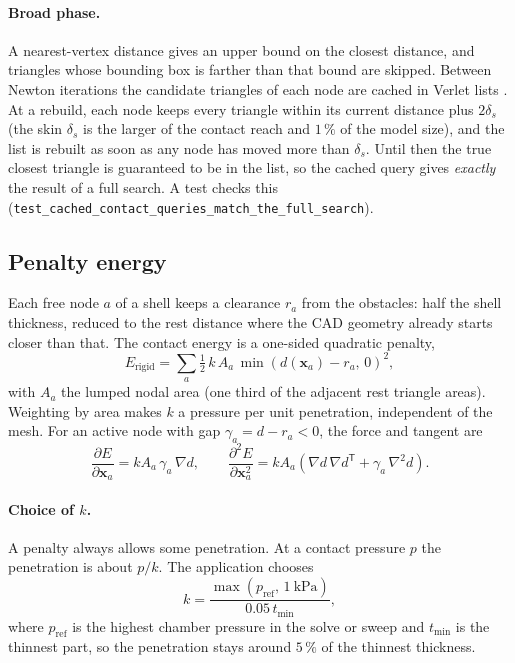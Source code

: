 \documentclass[11pt,a4paper]{article}
\newcommand{\vect}[1]{\bm{#1}}
\newcommand{\x}{\vect{x}}
\newcommand{\code}[1]{\texttt{#1}}
\theoremstyle{remark}
\begin{document}
\paragraph{Broad phase.} A nearest-vertex distance gives an upper bound on the closest distance,
and triangles whose bounding box is farther than that bound are skipped. Between Newton
iterations the candidate triangles of each node are cached in Verlet lists \cite{verlet1967}. At
a rebuild, each node keeps every triangle within its current distance plus $2\delta_s$ (the skin
$\delta_s$ is the larger of the contact reach and $1\,\%$ of the model size), and the list is
rebuilt as soon as any node has moved more than $\delta_s$. Until then the true closest triangle
is guaranteed to be in the list, so the cached query gives \emph{exactly} the result of a full
search. A test checks this (\code{test\_cached\_contact\_queries\_match\_the\_full\_search}).

\subsection{Penalty energy}

Each free node $a$ of a shell keeps a clearance $r_a$ from the obstacles: half the shell thickness,
reduced to the rest distance where the CAD geometry already starts closer than that. The contact
energy is a one-sided quadratic penalty,
\begin{equation}
E_{\text{rigid}} = \sum_a \tfrac12\,k\,A_a\,\min(d(\x_a)-r_a,\,0)^2,
\end{equation}
with $A_a$ the lumped nodal area (one third of the adjacent rest triangle areas). Weighting by
area makes $k$ a pressure per unit penetration, independent of the mesh. For an active node with
gap $\gamma_a = d-r_a<0$, the force and tangent are
\begin{equation}
\frac{\partial E}{\partial\x_a} = kA_a\,\gamma_a\,\nabla d,\qquad
\frac{\partial^2E}{\partial\x_a^2} = kA_a\left(\nabla d\,\nabla d^{\mathsf T} + \gamma_a\,\nabla^2 d\right).
\end{equation}

\paragraph{Choice of $k$.} A penalty always allows some penetration. At a contact pressure $p$ the
penetration is about $p/k$. The application chooses
\begin{equation}
k = \frac{\max(p_{\text{ref}},\,1\ \text{kPa})}{0.05\,t_{\min}},
\end{equation}
where $p_{\text{ref}}$ is the highest chamber pressure in the solve or sweep and $t_{\min}$ is the
thinnest part, so the penetration stays around $5\,\%$ of the thinnest thickness.
\end{document}

